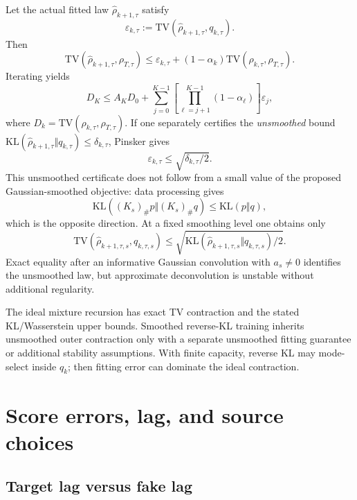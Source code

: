 \documentclass[11pt,a4paper]{article}
\newcommand{\KL}{\mathrm{KL}}
\newcommand{\TV}{\mathrm{TV}}
\theoremstyle{plain}
\theoremstyle{definition}
\begin{document}
Let the actual fitted law $\widehat\rho_{k+1,\tau}$ satisfy
\[
\varepsilon_{k,\tau}
:=\TV(\widehat\rho_{k+1,\tau},q_{k,\tau}).
\]
Then
\begin{equation}
\TV(\widehat\rho_{k+1,\tau},\rho_{T,\tau})
\le
\varepsilon_{k,\tau}
+(1-\alpha_k)\TV(\rho_{k,\tau},\rho_{T,\tau}).
\label{eq:fitting-tv}
\end{equation}
Iterating yields
\begin{equation}
D_K
\le A_KD_0+
\sum_{j=0}^{K-1}
\left[\prod_{\ell=j+1}^{K-1}(1-\alpha_\ell)\right]\varepsilon_j,
\label{eq:iterated-error}
\end{equation}
where $D_k=\TV(\rho_{k,\tau},\rho_{T,\tau})$.
If one separately certifies the \emph{unsmoothed} bound
$\KL(\widehat\rho_{k+1,\tau}\Vert q_{k,\tau})\le\delta_{k,\tau}$, Pinsker gives
\begin{equation}
\varepsilon_{k,\tau}\le\sqrt{\delta_{k,\tau}/2}.
\label{eq:pinsker}
\end{equation}
This unsmoothed certificate does not follow from a small value of the proposed Gaussian-smoothed
objective: data processing gives
\[
\KL((K_s)_\#p\Vert(K_s)_\#q)\le\KL(p\Vert q),
\]
which is the opposite direction.  At a fixed smoothing level one obtains only
\[
\TV(\widehat\rho_{k+1,\tau,s},q_{k,\tau,s})
\le
\sqrt{\KL(\widehat\rho_{k+1,\tau,s}\Vert q_{k,\tau,s})/2}.
\]
Exact equality after an informative Gaussian convolution with $a_s\ne0$ identifies the
unsmoothed law, but approximate deconvolution is unstable without additional regularity.

\begin{tcolorbox}[colback=red!4,colframe=red!45!black,title=What reverse KL does and does not inherit]
The ideal mixture recursion has exact TV contraction and the stated KL/Wasserstein upper bounds.
Smoothed reverse-KL training inherits unsmoothed outer contraction only with a separate
unsmoothed fitting guarantee or additional stability assumptions.  With finite capacity,
reverse KL may mode-select inside $q_k$; then fitting error can dominate the ideal contraction.
\end{tcolorbox}

\section{Score errors, lag, and source choices}
\label{sec:errors}

\subsection{Target lag versus fake lag}
\end{document}
